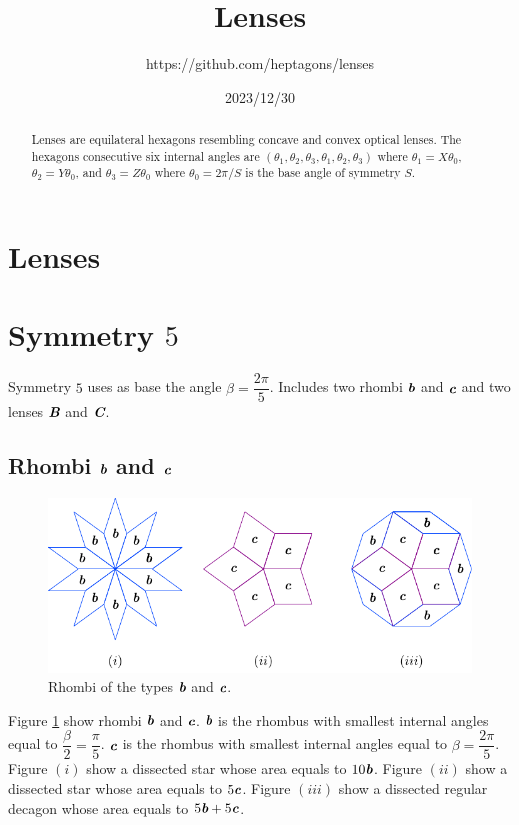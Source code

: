 \documentclass[11pt]{article}
\title{Lenses}
\author{https://github.com/heptagons/lenses}
\date{2023/12/30}
\def\mathbi#1{\textbf{\em #1}}
\begin{document}
\maketitle
\begin{abstract}
Lenses are equilateral hexagons resembling concave and convex optical lenses. The hexagons consecutive six internal angles are $(\theta_1,\theta_2,\theta_3,\theta_1,\theta_2,\theta_3)$ where $\theta_1=X\theta_0$, $\theta_2=Y\theta_0$, and $\theta_3=Z\theta_0$ where $\theta_0 = 2\pi/S$ is the base angle of symmetry $S$.
\end{abstract}

\section{Lenses}

\section{Symmetry $5$}

Symmetry $5$ uses as base the angle $\beta = \dfrac{2\pi}5$. Includes two rhombi $\mathbi{b}$ and $\mathbi{c}$ and two lenses $\mathbi{B}$ and $\mathbi{C}$.


\subsection{Rhombi $\mathbi{b}$ and $\mathbi{c}$}

\begin{figure}[H]
\centering
\includegraphics[scale=1.1]{bc/rhombi}
\caption{Rhombi of the types $\mathbi{b}$ and $\mathbi{c}$.}
\label{fig:bc-rhombi}
\end{figure}

Figure \ref{fig:bc-rhombi} show rhombi $\mathbi{b}$ and $\mathbi{c}$. $\mathbi{b}$ is the rhombus with smallest internal angles equal to $\dfrac{\beta}2 = \dfrac{\pi}5$. $\mathbi{c}$ is the rhombus with smallest internal angles equal to $\beta = \dfrac{2\pi}5$.
Figure $(i)$ show a dissected star whose area equals to $10\mathbi{b}$.
Figure $(ii)$ show a dissected star whose area equals to $5\mathbi{c}$.
Figure $(iii)$ show a dissected regular decagon whose area equals to $5\mathbi{b} + 5\mathbi{c}$.
\end{document}
